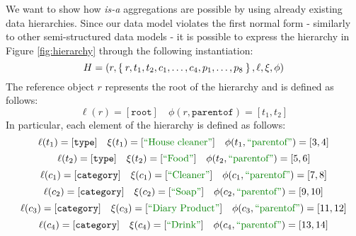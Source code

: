 \begin{example}[continues=ex:inaggr]
We want to show how \textit{is-a} aggregations are possible by using already existing data hierarchies. Since our data model violates the first normal form - similarly to other semi-structured data models - it is possible to express the hierarchy in Figure \vref{fig:hierarchy} through the following instantiation:
	\[H=(r,\Set{r,t_1,t_2,c_1,\dots,c_4,p_1,\dots,p_8},\ell,\xi,\phi)\]
	The reference object $r$ represents the root of the hierarchy and is defined as follows:
	\[\ell(r)=[\texttt{root}]\quad \phi(r,\texttt{parentof})=[t_1,t_2]\]
	In particular, each element of the hierarchy is defined as follows:
	\[\defzt{t_1}{type}{House cleaner}{parentof}{3,4}\]
	\[\defzt{t_2}{type}{Food}{parentof}{5,6}\]
	\[\defzt{c_1}{category}{Cleaner}{parentof}{7,8}\]
	\[\defzt{c_2}{category}{Soap}{parentof}{9,10}\]
	\[\defzt{c_3}{category}{Diary Product}{parentof}{11,12}\]
	\[\defzt{c_4}{category}{Drink}{parentof}{13,14}\]
	

\end{example}
